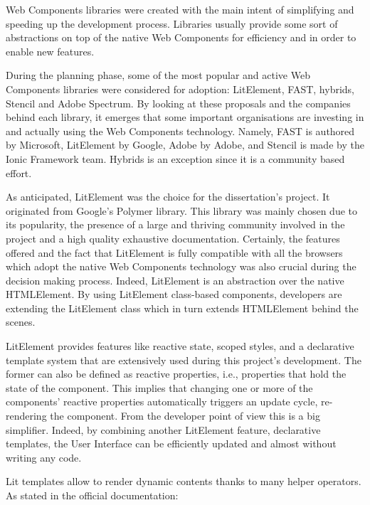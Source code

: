 Web Components libraries were created with the main intent of simplifying and speeding up the development process. Libraries usually provide some sort of abstractions on top of the native Web Components for efficiency and in order to enable new features.

During the planning phase, some of the most popular and active Web Components libraries were considered for adoption: LitElement, FAST, hybrids, Stencil and Adobe Spectrum.
By looking at these proposals and the companies behind each library, it emerges that some important organisations are investing in and actually using the Web Components technology. Namely, FAST is authored by Microsoft, LitElement by Google, Adobe by Adobe, and Stencil is made by the Ionic Framework team. Hybrids is an exception since it is a community based effort.

As anticipated, LitElement was the choice for the dissertation’s project. It originated from Google’s Polymer library. This library was mainly chosen due to its popularity, the presence of a large and thriving community involved in the project and a high quality exhaustive documentation. Certainly, the features offered and the fact that LitElement is fully compatible with all the browsers which adopt the native Web Components technology was also crucial during the decision making process.
Indeed, LitElement is an abstraction over the native HTMLElement. By using LitElement class-based components, developers are extending the LitElement class which in turn extends HTMLElement behind the scenes.

LitElement provides features like reactive state, scoped styles, and a declarative template system that are extensively used during this project’s development. The former can also be defined as reactive properties, i.e., properties that hold the state of the component. This implies that changing one or more of the components' reactive properties automatically triggers an update cycle, re-rendering the component. From the developer point of view this is a big simplifier. Indeed, by combining another LitElement feature, declarative templates, the User Interface can be efficiently updated and almost without writing any code.

Lit templates allow to render dynamic contents thanks to many helper operators. As stated in the official documentation:

